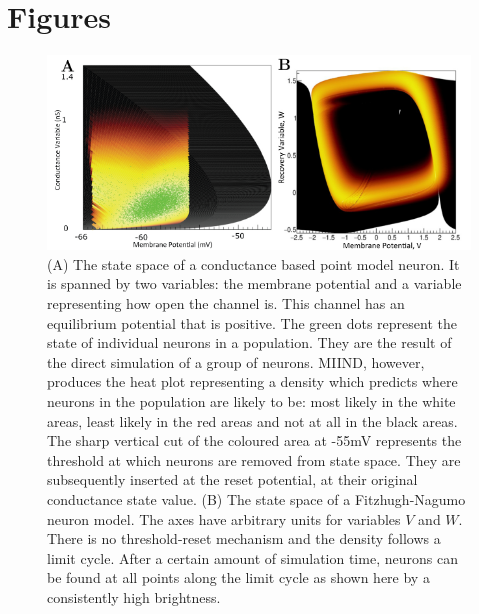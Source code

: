 \documentclass[utf8]{frontiersSCNS} %
\begin{document}
\clearpage

\section*{Figures}


\begin{figure}[htb!]
  \centering
    \includegraphics[width=\linewidth]{images/cloud_full_figure.pdf}
  \caption{(A) The state space of a conductance based point model neuron. It is spanned by two variables: the membrane potential and a variable representing how open the channel is. This channel has an equilibrium potential that is positive. The green dots represent the state of individual neurons in a population. They are the result of the direct simulation of a group of neurons. MIIND, however, produces the heat plot representing a density which predicts where neurons in the population are likely to be: most likely in the white areas, least likely in  the red areas and not at all in the black areas. The sharp vertical cut of the coloured area at -55mV represents the threshold at which neurons are removed from state space. They are subsequently inserted at the reset potential, at their original conductance state value. (B) The state space of a Fitzhugh-Nagumo neuron model. The axes have arbitrary units for variables $V$ and $W$. There is no threshold-reset mechanism and the density follows a limit cycle. After a certain amount of simulation time, neurons can be found at all points along the limit cycle as shown here by a consistently high brightness.}
  \label{fig-cloud}
\end{figure}
\end{document}
